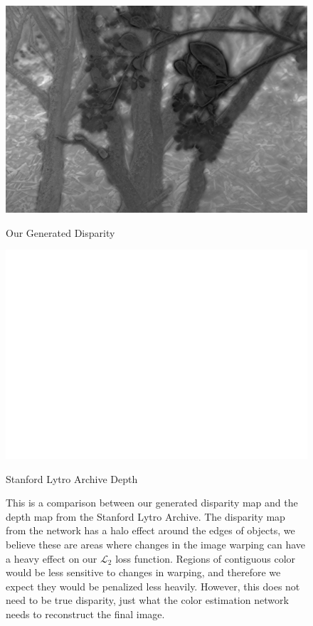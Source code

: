 \documentclass[10pt,twocolumn,letterpaper]{article}
\begin{document}
\begin{figure}[p]
    \begin{multicols}{2}
        \includegraphics[width=\linewidth]{flowers_25/ours_05_05_disp.png}\par\caption*{Our Generated Disparity}
        \includegraphics[width=\linewidth]{flowers_25/stanford_depth.png}\par\caption*{Stanford Lytro Archive Depth}
    \end{multicols}
    \caption{
        This is a comparison between our generated disparity map and the depth map from the Stanford Lytro Archive.
        The disparity map from the network has a halo effect around the edges of objects, we believe these are areas where changes
        in the image warping can have a heavy effect on our $\mathcal{L}_2$ loss function. Regions of contiguous color
        would be less sensitive to changes in warping, and therefore we expect they would be penalized less heavily.
        However, this does not need to be true disparity, just what the color estimation network needs to reconstruct the final image.
    }
\end{figure}
\end{document}
